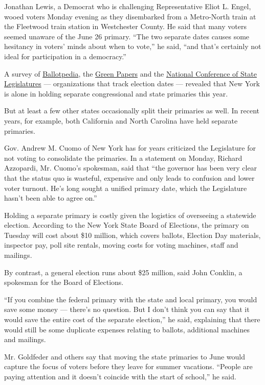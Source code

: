 Jonathan Lewis, a Democrat who is challenging Representative Eliot L.
Engel, wooed voters Monday evening as they disembarked from a
Metro-North train at the Fleetwood train station in Westchester County.
He said that many voters seemed unaware of the June 26 primary. ``The
two separate dates causes some hesitancy in voters' minds about when to
vote,'' he said, ``and that's certainly not ideal for participation in a
democracy.''

A survey of \href{https://ballotpedia.org/Main_Page}{Ballotpedia}, the
\href{http://www.thegreenpapers.com/}{Green Papers} and the
\href{http://www.ncsl.org/}{National Conference of State Legislatures}
--- organizations that track election dates --- revealed that New York
is alone in holding separate congressional and state primaries this
year.

But at least a few other states occasionally split their primaries as
well. In recent years, for example, both California and North Carolina
have held separate primaries.

Gov. Andrew M. Cuomo of New York has for years criticized the
Legislature for not voting to consolidate the primaries. In a statement
on Monday, Richard Azzopardi, Mr. Cuomo's spokesman, said that ``the
governor has been very clear that the status quo is wasteful, expensive
and only leads to confusion and lower voter turnout. He's long sought a
unified primary date, which the Legislature hasn't been able to agree
on.''

Holding a separate primary is costly given the logistics of overseeing a
statewide election. According to the New York State Board of Elections,
the primary on Tuesday will cost about \$10 million, which covers
ballots, Election Day materials, inspector pay, poll site rentals,
moving costs for voting machines, staff and mailings.

By contrast, a general election runs about \$25 million, said John
Conklin, a spokesman for the Board of Elections.

``If you combine the federal primary with the state and local primary,
you would save some money --- there's no question. But I don't think you
can say that it would save the entire cost of the separate election,''
he said, explaining that there would still be some duplicate expenses
relating to ballots, additional machines and mailings.

Mr. Goldfeder and others say that moving the state primaries to June
would capture the focus of voters before they leave for summer
vacations. ``People are paying attention and it doesn't coincide with
the start of school,'' he said.

